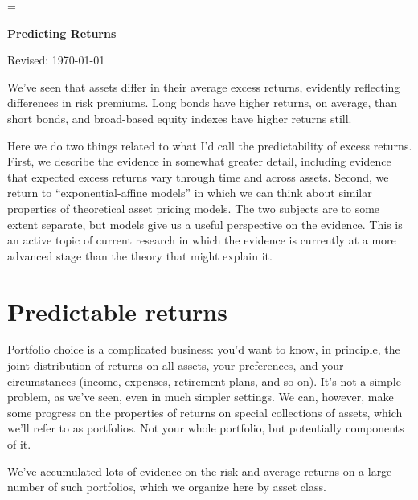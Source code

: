 \documentclass[11pt]{article}
\begin{document}
\parskip=\bigskipamount
\parindent=0.0in
\thispagestyle{empty}


\bigskip\bigskip
\centerline{\Large \bf Predicting Returns}
\centerline{Revised: \today}

\begin{comment}
Can we convert bond models to returns?

\end{comment}

\bigskip
We've seen that assets differ in their average excess returns,
evidently reflecting differences in risk premiums.
Long bonds have higher returns, on average, than short bonds,
and broad-based equity indexes have higher returns still.

Here we do two things related to what I'd call the predictability of
excess returns.  First, we describe the evidence in somewhat greater detail,
including evidence that expected excess returns vary through time and across assets.
Second, we return to ``exponential-affine models'' in which we can think
about similar properties of theoretical asset pricing models.
The two subjects are to some extent separate,
but models give us a useful perspective on the evidence.
This is an active topic of current research in which
the evidence is currently at a more advanced stage than the theory that might explain it.


\section{Predictable returns}

Portfolio choice is a complicated business:  you'd want to know,
in principle, the joint distribution of returns on all assets,
your preferences, and your circumstances (income, expenses, retirement plans, and so on).
It's not a simple problem, as we've seen, even in much simpler settings.
We can, however, make some progress on the properties of returns
on special collections of assets, which we'll refer to as portfolios.
Not your whole portfolio, but potentially components of it.

We've accumulated lots of evidence on the risk and average returns
on a large number of such portfolios, which we organize here by asset class.
\end{document}
